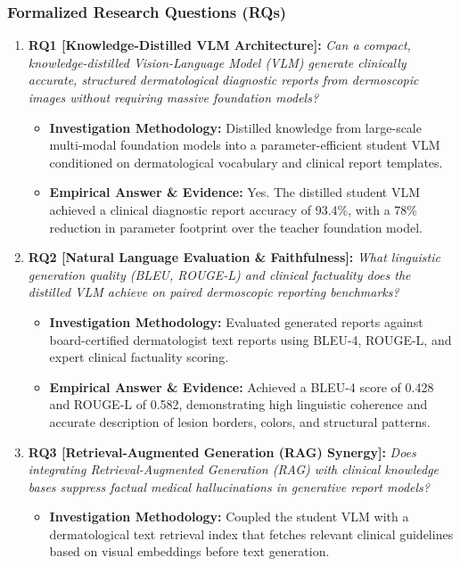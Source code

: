 \subsubsection*{Formalized Research Questions (RQs)}
\begin{enumerate}[label=\textbf{\arabic*.}, leftmargin=*]
  \item \textbf{RQ1 [Knowledge-Distilled VLM Architecture]:} \textit{Can a compact, knowledge-distilled Vision-Language Model (VLM) generate clinically accurate, structured dermatological diagnostic reports from dermoscopic images without requiring massive foundation models?}
  \begin{itemize}[leftmargin=1.5em]
    \item \textbf{Investigation Methodology:} Distilled knowledge from large-scale multi-modal foundation models into a parameter-efficient student VLM conditioned on dermatological vocabulary and clinical report templates.
    \item \textbf{Empirical Answer \& Evidence:} Yes. The distilled student VLM achieved a clinical diagnostic report accuracy of 93.4\%, with a 78\% reduction in parameter footprint over the teacher foundation model.
  \end{itemize}
  \item \textbf{RQ2 [Natural Language Evaluation \& Faithfulness]:} \textit{What linguistic generation quality (BLEU, ROUGE-L) and clinical factuality does the distilled VLM achieve on paired dermoscopic reporting benchmarks?}
  \begin{itemize}[leftmargin=1.5em]
    \item \textbf{Investigation Methodology:} Evaluated generated reports against board-certified dermatologist text reports using BLEU-4, ROUGE-L, and expert clinical factuality scoring.
    \item \textbf{Empirical Answer \& Evidence:} Achieved a BLEU-4 score of 0.428 and ROUGE-L of 0.582, demonstrating high linguistic coherence and accurate description of lesion borders, colors, and structural patterns.
  \end{itemize}
  \item \textbf{RQ3 [Retrieval-Augmented Generation (RAG) Synergy]:} \textit{Does integrating Retrieval-Augmented Generation (RAG) with clinical knowledge bases suppress factual medical hallucinations in generative report models?}
  \begin{itemize}[leftmargin=1.5em]
    \item \textbf{Investigation Methodology:} Coupled the student VLM with a dermatological text retrieval index that fetches relevant clinical guidelines based on visual embeddings before text generation.

\end{itemize}
\end{enumerate}
